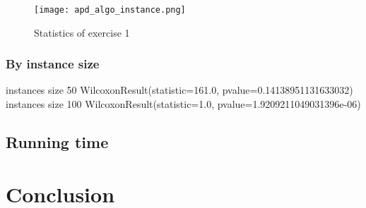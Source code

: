 \documentclass[a4paper,10pt]{article}
\begin{document}
\begin{figure}[H]
	\centering
	\caption{Statistics of exercise 1}
	\texttt{[image: apd\_algo\_instance.png]}
\end{figure}

\subsubsection{By instance size}

instances size 50
WilcoxonResult(statistic=161.0, pvalue=0.14138951131633032)
instances size 100
WilcoxonResult(statistic=1.0, pvalue=1.9209211049031396e-06)

\subsection{Running time}

\section{Conclusion}
\end{document}
